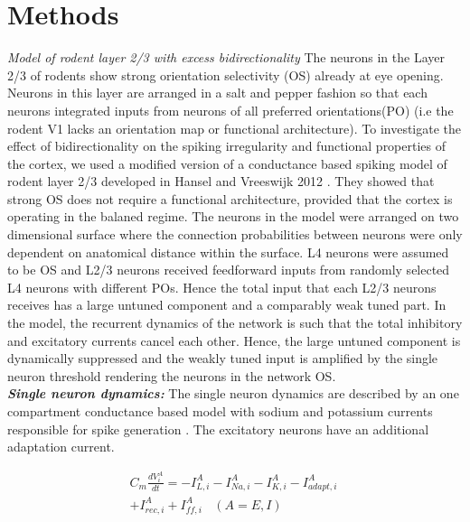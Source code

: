 \section{Methods}
\textit{Model of rodent layer 2/3 with excess bidirectionality}
The neurons in the Layer 2/3 of rodents show strong orientation selectivity (OS) already at eye opening. Neurons in this layer are arranged in a salt and pepper fashion so that each neurons integrated inputs from neurons of all preferred orientations(PO) (i.e the rodent V1 lacks an orientation map or functional architecture). To investigate the effect of bidirectionality on the spiking irregularity and functional properties of the cortex, we used a modified version of a conductance based spiking model of rodent layer 2/3 developed in Hansel and Vreeswijk 2012 \cite{Hansel2012}. They showed that strong OS does not require a functional architecture, provided that the cortex is operating in the balaned regime.
The neurons in the model were arranged on two dimensional surface where the connection probabilities between neurons were only dependent on anatomical distance within the surface. L4 neurons were assumed to be OS and L2/3 neurons received feedforward inputs from randomly selected L4 neurons with different POs. Hence the total input that each L2/3 neurons receives has a large untuned component and a comparably weak tuned part. In the model, the recurrent dynamics of the network is such that the total inhibitory and excitatory currents cancel each other. Hence, the large untuned component is dynamically suppressed and the weakly tuned input is amplified by the single neuron threshold rendering the neurons in the network OS. \\

\textbf{\textit{Single neuron dynamics:}}
The single neuron dynamics are described by an one compartment conductance based model with sodium and potassium currents responsible for spike generation \cite{wang1996}. The excitatory neurons have an additional adaptation current.

\begin{equation}
\begin{split}
C_{m} \frac{dV_{i}^{A}}{dt} = -I_{L, i}^{A} -I_{Na, i}^{A}-I_{K, i}^{A} -I_{adapt, i}^{A}\  \\ + I_{rec, i}^{A} + I_{ff, i}^{A} \,\,\;\; (A = E, I) 
\end{split}
\end{equation}

